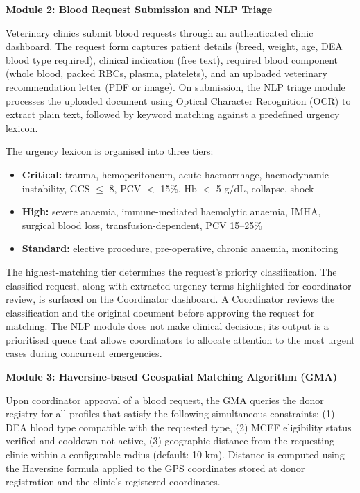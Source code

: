 \documentclass[12pt,a4paper]{article}
\begin{document}
\vspace{1em}
\noindent\textbf{Module 2: Blood Request Submission and NLP Triage}
\vspace{0.5em}

\noindent Veterinary clinics submit blood requests through an authenticated clinic dashboard. The request form captures patient details (breed, weight, age, DEA blood type required), clinical indication (free text), required blood component (whole blood, packed RBCs, plasma, platelets), and an uploaded veterinary recommendation letter (PDF or image). On submission, the NLP triage module processes the uploaded document using Optical Character Recognition (OCR) to extract plain text, followed by keyword matching against a predefined urgency lexicon.

\noindent The urgency lexicon is organised into three tiers:

\begin{itemize}[leftmargin=1.5em, itemsep=0.3em]
    \item \textbf{Critical:} trauma, hemoperitoneum, acute haemorrhage, haemodynamic instability, GCS $\leq$ 8, PCV $<$ 15\%, Hb $<$ 5 g/dL, collapse, shock
    \item \textbf{High:} severe anaemia, immune-mediated haemolytic anaemia, IMHA, surgical blood loss, transfusion-dependent, PCV 15--25\%
    \item \textbf{Standard:} elective procedure, pre-operative, chronic anaemia, monitoring
\end{itemize}

\noindent The highest-matching tier determines the request's priority classification. The classified request, along with extracted urgency terms highlighted for coordinator review, is surfaced on the Coordinator dashboard. A Coordinator reviews the classification and the original document before approving the request for matching. The NLP module does not make clinical decisions; its output is a prioritised queue that allows coordinators to allocate attention to the most urgent cases during concurrent emergencies.

\vspace{1em}
\noindent\textbf{Module 3: Haversine-based Geospatial Matching Algorithm (GMA)}
\vspace{0.5em}

\noindent Upon coordinator approval of a blood request, the GMA queries the donor registry for all profiles that satisfy the following simultaneous constraints: (1) DEA blood type compatible with the requested type, (2) MCEF eligibility status verified and cooldown not active, (3) geographic distance from the requesting clinic within a configurable radius (default: 10 km). Distance is computed using the Haversine formula applied to the GPS coordinates stored at donor registration and the clinic's registered coordinates.
\end{document}
